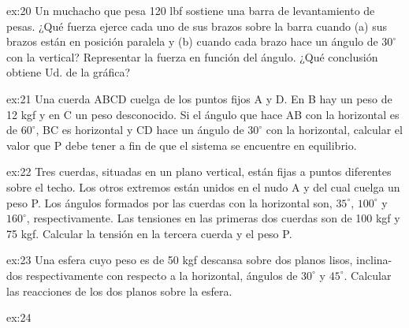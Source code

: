 \begin{multicols}{2}
     \begin{excercise}[][][$(a)=60\ \mathrm{lbf}$, $(b)=69 \ \mathrm{lbf}$]{ex:20}{
        Un muchacho que pesa 120 lbf sostiene una barra de levantamiento de pesas. ¿Qué fuerza ejerce cada uno de sus brazos sobre la barra cuando (a) sus brazos están en posición paralela y (b) cuando cada brazo hace un ángulo de $30^\circ$ con la vertical? Representar la fuerza en función del ángulo. ¿Qué conclusión obtiene Ud. de la gráfica?
         }
     \end{excercise}
    \begin{excercise}[][][$P=4\ \mathrm{Kgf}$]{ex:21}{
       Una cuerda ABCD cuelga de los puntos fijos A y D. En B hay un peso de 12 kgf y en C un peso desconocido. Si el ángulo que hace AB con la horizontal es de $60^\circ$, BC es horizontal y CD hace un ángulo de $30^\circ$ con la horizontal, calcular el valor que P debe tener a fin de que el sistema se encuentre en equilibrio.         
        }
     \end{excercise}
     \begin{excercise}[][][$T_3=73.3\ \mathrm{Kgf}$, $P=156.3 \ \mathrm{Kgf}$]{ex:22}{
       Tres cuerdas, situadas en un plano vertical, están fijas a puntos diferentes sobre el techo. Los otros extremos están unidos en el nudo A y del cual cuelga un peso P. Los ángulos formados por las cuerdas con la horizontal son, $35^\circ$, $100^\circ$ y $160^\circ$, respectivamente. Las tensiones en las primeras dos cuerdas son de 100 kgf y 75 kgf. Calcular la tensión en la tercera cuerda y el peso P.       
        }
     \end{excercise}
     \begin{excercise}[][][$R_1=36.7\ \mathrm{Kgf}$, $R_2=25.9 \ \mathrm{Kgf}$]{ex:23}{
       Una esfera cuyo peso es de 50 kgf descansa sobre dos planos lisos, inclina- dos respectivamente con respecto a la horizontal, ángulos de $30^\circ$ y $45^\circ$. Calcular las reacciones de los dos planos sobre la esfera.       
        }
     \end{excercise} 
     \begin{excercise}{ex:24}{
}
\end{excercise}
\end{multicols}
